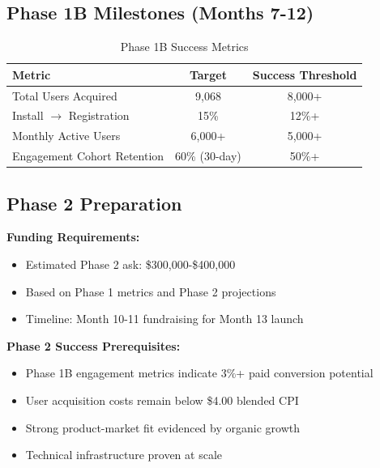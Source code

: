 \documentclass[11pt,letterpaper]{article}
\begin{document}
\subsection{Phase 1B Milestones (Months 7-12)}

\begin{table}[h]
\centering
\caption{Phase 1B Success Metrics}
\begin{tabular}{|l|c|c|}
\hline
\textbf{Metric} & \textbf{Target} & \textbf{Success Threshold} \\
\hline
Total Users Acquired & 9,068 & 8,000+ \\
Install $\rightarrow$ Registration & 15\% & 12\%+ \\
Monthly Active Users & 6,000+ & 5,000+ \\
Engagement Cohort Retention & 60\% (30-day) & 50\%+ \\
\hline
\end{tabular}
\end{table}

\subsection{Phase 2 Preparation}

\textbf{Funding Requirements:}
\begin{itemize}
\item Estimated Phase 2 ask: \$300,000-\$400,000
\item Based on Phase 1 metrics and Phase 2 projections
\item Timeline: Month 10-11 fundraising for Month 13 launch
\end{itemize}

\textbf{Phase 2 Success Prerequisites:}
\begin{itemize}
\item Phase 1B engagement metrics indicate 3\%+ paid conversion potential
\item User acquisition costs remain below \$4.00 blended CPI
\item Strong product-market fit evidenced by organic growth
\item Technical infrastructure proven at scale
\end{itemize}

\vspace{2cm}
\end{document}
